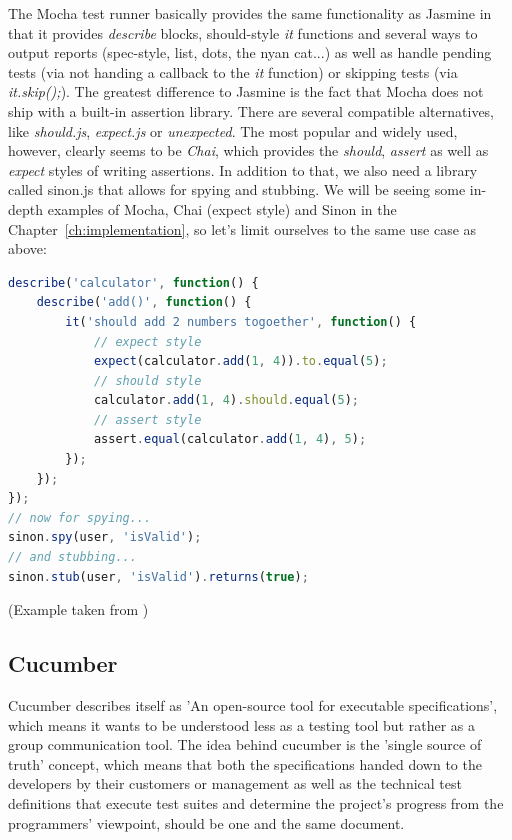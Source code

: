 	The Mocha test runner basically provides the same functionality as Jasmine in that it provides \textit{describe} blocks, should-style \textit{it} functions and several ways to output reports (spec-style, list, dots, the nyan cat...) as well as handle pending tests (via not handing a callback to the \textit{it} function) or skipping tests (via \textit{it.skip();}). The greatest difference to Jasmine is the fact that Mocha does not ship with a built-in assertion library. There are several compatible alternatives, like \textit{should.js}, \textit{expect.js} or \textit{unexpected}. The most popular and widely used, however, clearly seems to be \textit{Chai}, which provides the \textit{should}, \textit{assert} as well as \textit{expect} styles of writing assertions. In addition to that, we also need a library called sinon.js that allows for spying and stubbing. We will be seeing some in-depth examples of Mocha, Chai (expect style) and Sinon in the Chapter~\ref{ch:implementation}, so let's limit ourselves to the same use case as above:
	
	\begin{lstlisting}[caption={Mocha example of a nested test suite containing one simple assertion in expect style as well as a spy and a stub}, label={fig:mocha_chai_sinon}, language=JavaScript]
describe('calculator', function() {
	describe('add()', function() {
		it('should add 2 numbers togoether', function() {
			// expect style
			expect(calculator.add(1, 4)).to.equal(5);
			// should style
			calculator.add(1, 4).should.equal(5);
			// assert style
			assert.equal(calculator.add(1, 4), 5);
		});
	});
});
// now for spying...
sinon.spy(user, 'isValid');
// and stubbing...
sinon.stub(user, 'isValid').returns(true);
	\end{lstlisting}
	\small
	(Example taken from \citep{JSTestTest})

	\subsection{Cucumber}
	\label{ssect:selenium}
	
	Cucumber describes itself as 'An open-source tool for executable specifications', which means it wants to be understood less as a testing tool but rather as a group communication tool. The idea behind cucumber is the 'single source of truth' concept, which means that both the specifications handed down to the developers by their customers or management as well as the technical test definitions that execute test suites and determine the project's progress from the programmers' viewpoint, should be one and the same document.
	
